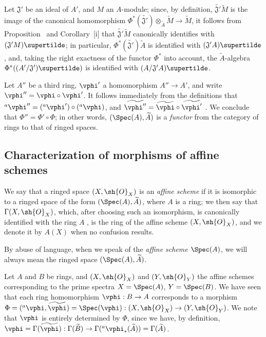 \begin{env}[1.6.9]
\label{I.1.6.9}
Let $\mathfrak{J}'$ be an ideal of $A'$, and $M$ an $A$-module;
since, by definition, $\widetilde{\mathfrak{J}'}\widetilde{M}$ is the image of the canonical homomorphism $\Phi^*(\widetilde{\mathfrak{J}'})\otimes_{\widetilde{A}}\widetilde{M}\to\widetilde{M}$, it
follows from Proposition~ and Corollary~[i] that
$\widetilde{\mathfrak{J}'}\widetilde{M}$ canonically identifies with $(\mathfrak{J}' M)\supertilde$;
in particular, $\Phi^*(\widetilde{\mathfrak{J}'})\widetilde{A}$ is identified with $(\mathfrak{J}' A)\supertilde$, and, taking the right exactness of the functor $\Phi^*$ into account,
the $\widetilde{A}$-algebra $\Phi^*((A'/\mathfrak{J}')\supertilde)$ is identified with $(A/\mathfrak{J}' A)\supertilde$.
\end{env}

\begin{env}[1.6.10]
\label{I.1.6.10}
Let $A''$ be a third ring, $\vphi'$ a homomorphism $A''\to A'$, and write $\vphi''=\vphi\circ\vphi'$.
It follows immediately from the definitions that ${}^a\vphi''=({}^a\vphi')\circ({}^a\vphi)$, and $\widetilde{\vphi''}=\widetilde{\vphi}\circ\widetilde{\vphi'}$ . We conclude that $\Phi''=\Phi'\circ\Phi$;
in other words, $(\Spec(A),\widetilde{A})$ is a \emph{functor} from the category of rings to that of ringed spaces.
\end{env}

\subsection{Characterization of morphisms of affine schemes}
\label{subsection:I.1.7}

\begin{definition}[1.7.1]
\label{I.1.7.1}
We say that a ringed space $(X,\sh{O}_X)$ is an \emph{affine scheme} if it is isomorphic to a ringed space of the form $(\Spec(A),\widetilde{A})$, where $A$ is a ring;
we then say that $\Gamma(X,\sh{O}_X)$, which, after choosing such an isomorphism, is canonically identified with the ring $A$ , is the ring of the affine scheme $(X,\sh{O}_X)$, and we denote it by $A(X)$ when no confusion results.
\end{definition}

By abuse of language, when we speak of the \emph{affine scheme $\Spec(A)$}, we will always mean the ringed space $(\Spec(A),\widetilde{A})$.
\begin{env}[1.7.2]
\label{I.1.7.2}
Let $A$ and $B$ be rings, and $(X,\sh{O}_X)$ and $(Y,\sh{O}_Y)$ the affine schemes corresponding to the prime spectra $X=\Spec(A)$, $Y=\Spec(B)$.
We have seen  that each ring homomorphism $\vphi:B\to A$ corresponds to a morphism $\Phi=({}^a\vphi,\widetilde{\vphi})=\Spec(\vphi):(X,\sh{O}_X)\to(Y,\sh{O}_Y)$.
We note that $\vphi$ is entirely determined by $\Phi$, since we have, by definition, $\vphi=\Gamma(\widetilde{\vphi}):\Gamma(\widetilde{B})\to\Gamma({}^a\vphi_*(\widetilde{A}))=\Gamma(\widetilde{A})$.
\end{env}

